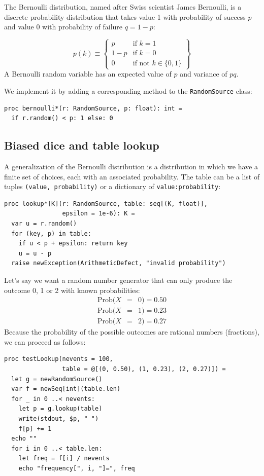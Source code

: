 \documentclass[justified, sixbynine]{tufte-book}
\def\ft{\small\tt}
\theoremstyle{plain}%
\newtheorem * {corollary}{Corollary}
\theoremstyle{definition}
\theoremstyle{remark}
\newtheorem * {remark}{Remark}
\newtheorem * {note}{Note}
\begin{document}
\begin{fullwidth}
The Bernoulli distribution, named after Swiss scientist James Bernoulli, is
a discrete probability distribution that takes value 1 with
probability of success $p$ and value 0 with probability of failure $q=1-p$:

\begin{equation}
p(k) \equiv \left\{
\begin{array}{ll}
p & \text{if }k=1 \\
1-p & \text{if }k=0 \\
0 & \text{if not }k \in \{0, 1\}
\end{array}
\right\}
\end{equation}
A Bernoulli random variable has an expected value of $p$ and variance of $pq$.

We implement it by adding a corresponding method to the {\ft RandomSource} class:

\begin{lstlisting}[caption={in file: {\ft nlib/randomgen.nim}}]
proc bernoulli*(r: RandomSource, p: float): int =
  if r.random() < p: 1 else: 0
\end{lstlisting}

\goodbreak\subsection{Biased dice and table lookup}

A generalization of the Bernoulli distribution is a distribution in which we have a finite set of choices, each with an associated probability. The table can be a list of tuples {\ft (value, probability)} or a dictionary of {\ft value:probability}:

\begin{lstlisting}[caption={in file: {\ft nlib/randomgen.nim}}]
proc lookup*[K](r: RandomSource, table: seq[(K, float)],
                epsilon = 1e-6): K =
  var u = r.random()
  for (key, p) in table:
    if u < p + epsilon: return key
    u = u - p
  raise newException(ArithmeticDefect, "invalid probability")
\end{lstlisting}

Let's say we want a random number generator that can only produce the
outcome 0, 1 or 2 with known probabilities:
\begin{eqnarray}
\textrm{Prob}(X &=&0)=0.50 \\
\textrm{Prob}(X &=&1)=0.23 \\
\textrm{Prob}(X &=&2)=0.27
\end{eqnarray}
Because the probability of the possible outcomes are rational numbers
(fractions), we can proceed as follows:
\begin{lstlisting}
proc testLookup(nevents = 100,
                table = @[(0, 0.50), (1, 0.23), (2, 0.27)]) =
  let g = newRandomSource()
  var f = newSeq[int](table.len)
  for _ in 0 ..< nevents:
    let p = g.lookup(table)
    write(stdout, $p, " ")
    f[p] += 1
  echo ""
  for i in 0 ..< table.len:
    let freq = f[i] / nevents
    echo "frequency[", i, "]=", freq
\end{lstlisting}


\end{fullwidth}
\end{document}
